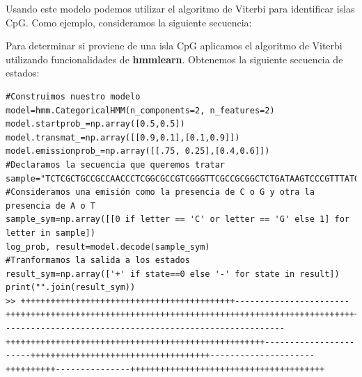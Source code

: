 Usando este modelo podemos utilizar el algoritmo de Viterbi para identificar islas CpG. Como ejemplo, consideramos la siguiente secuencia:



Para determinar si proviene de una isla CpG aplicamos el algoritmo de Viterbi utilizando funcionalidades de \textbf{hmmlearn}. Obtenemos la siguiente secuencia de estados:

\begin{verbatim}
#Construimos nuestro modelo
model=hmm.CategoricalHMM(n_components=2, n_features=2)
model.startprob_=np.array([0.5,0.5])
model.transmat_=np.array([[0.9,0.1],[0.1,0.9]])
model.emissionprob_=np.array([[.75, 0.25],[0.4,0.6]])
#Declaramos la secuencia que queremos tratar
sample="TCTCGCTGCCGCCAACCCTCGGCGCCGTCGGGTTCGCCGCGGCTCTGATAAGTCCCGTTTATGGTACCCGGGCCGATCTCTGGTGGGAATCGGAGACCTGTGTACCCTGACGCATCCGTTTGTGTTCCCTACACGGCCGACGCAGACCGGGCGCGCGGCGCCACCCAACGAAGCCCGGGTATGGCACGTGCCCCAGGCGGTGCCCTACCCGTATTTCGGGACAAGTTCCCGGATCGGGTGAAAGTTAACGGAAGGATGCCAAGCAATAGCGGCCACAGGACCCGCCTGGCGACGCATGGACTGGATCCGGAGGTCTGGCCAACAGTTGATTTCATGGGTTACAGCCCCGGTGTAGATCCCCTCATGGTCTCCCGAACCGATTAGTTTGAAAACTGTATCTCCTGGCCGCCTAACAGGTATAAAGAGCCGGCTCACACTGGGGTGAGGGGGCGCGTGGCCCCCTT"
#Consideramos una emisión como la presencia de C o G y otra la presencia de A o T
sample_sym=np.array([[0 if letter == 'C' or letter == 'G' else 1] for letter in sample])
log_prob, result=model.decode(sample_sym)
#Tranformamos la salida a los estados
result_sym=np.array(['+' if state==0 else '-' for state in result])
print("".join(result_sym))
>> +++++++++++++++++++++++++++++++++++++++++++-----------------------+++++++++++++++++++++++++++++++++++++++++++++++++++++++++++++++++++++++++++++++++++++++++++++++++++++++++++++++++++++++++++++++++++++++++++++++++---------------------------------------------------------++++++++++++++++++++++++++++++++++++++++++++++++++++-----------------------++++++++++++++++++++++++++++++++++++---------------------++++++++++---------------+++++++++++++++++++++++++++++++++++++++

\end{verbatim}

